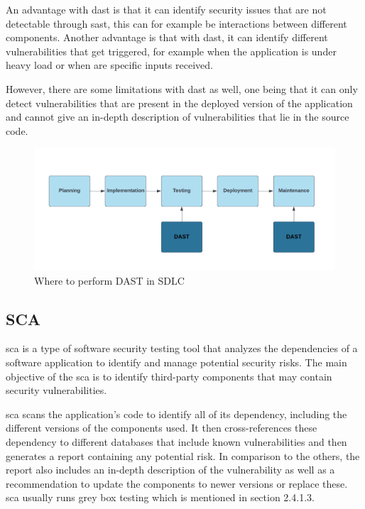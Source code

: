 An advantage with \acrshort{dast} is that it can identify security issues that are not detectable through \acrshort{sast}, this can for example be interactions between different components. Another advantage is that with \acrshort{dast}, it can identify different vulnerabilities that get triggered, for example when the application is under heavy load or when are specific inputs received.

However, there are some limitations with \acrshort{dast} as well, one being that it can only detect vulnerabilities that are present in the deployed version of the application and cannot give an in-depth description of vulnerabilities that lie in the source code.
\begin{figure}[H]
    \centering
    \includegraphics[width=0.8\columnwidth]{Images/dast.png}
    \caption{Where to perform DAST in SDLC} 
    \label{fig: Where to perform DAST in SDLC}
\end{figure}



\subsection{SCA}
\acrlong{sca} is a type of software security testing tool that analyzes the dependencies of a software application to identify and manage potential security risks. The main objective of the \acrshort{sca} is to identify third-party components that may contain security vulnerabilities. \cite{sca}

 \acrshort{sca} scans the application's code to identify all of its \gls{dependency}, including the different versions of the components used. It then cross-references these \gls{dependency} to different databases that include known vulnerabilities and then generates a report containing any potential risk. In comparison to the others, the report also includes an in-depth description of the vulnerability as well as a recommendation to update the components to newer versions or replace these. \acrshort{sca} usually runs grey box testing  which is mentioned in section 2.4.1.3. 

